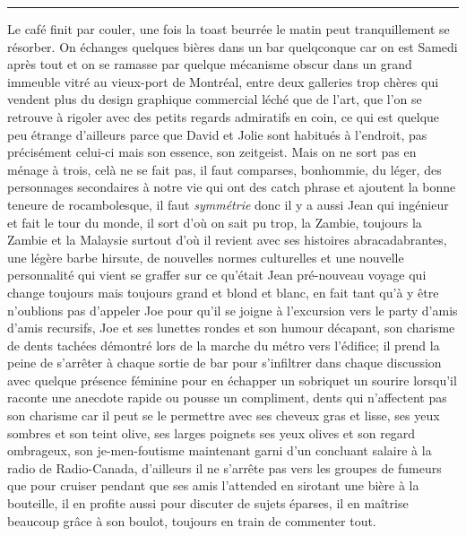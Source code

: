 \begin{center}\noindent\rule{0.5\textwidth}{0.4pt}\end{center} Le café finit par
couler, une fois la toast beurrée le matin peut tranquillement  se résorber. On
échanges quelques bières dans
un bar quelqconque car on est Samedi après tout et on se ramasse par quelque
mécanisme obscur dans un grand immeuble vitré au vieux-port de Montréal, entre
deux galleries trop chères qui vendent plus du design graphique commercial léché
que de l'art, que l'on se retrouve à rigoler avec des petits regards admiratifs
en coin, ce qui est quelque peu étrange d'ailleurs parce que David
et Jolie sont habitués à l'endroit, pas précisément celui-ci mais son essence,
son zeitgeist. Mais on ne sort pas en ménage à trois, celà ne se fait pas,
il faut comparses, bonhommie, du léger, des personnages secondaires
à notre vie qui ont des catch phrase et ajoutent la bonne teneure de 
rocambolesque, il faut \emph{symmétrie} donc il y a aussi Jean qui ingénieur et
fait le tour du monde, il sort d'où on sait pu trop, la Zambie, toujours la
Zambie et la Malaysie surtout d'où il revient avec ses histoires
abracadabrantes, une légère barbe hirsute, de nouvelles normes culturelles et
une nouvelle personnalité qui vient se graffer sur ce qu'était Jean pré-nouveau
voyage qui change toujours mais toujours grand et blond et blanc, en fait tant
qu'à y être n'oublions pas d'appeler Joe pour qu'il se joigne à l'excursion vers
le party d'amis d'amis recursifs, Joe et  ses lunettes rondes et son humour
décapant, son charisme de dents tachées démontré lors de la marche du métro
vers l'édifice; il prend la peine de s'arrêter à chaque sortie de bar
pour s'infiltrer dans chaque discussion avec quelque présence féminine pour
en échapper un sobriquet un sourire lorsqu'il raconte une anecdote rapide
ou pousse un compliment, dents qui n'affectent pas son charisme
car il peut se le permettre avec ses cheveux gras et lisse, ses yeux sombres et
son teint olive, ses larges poignets ses yeux olives et son regard ombrageux,
son je-men-foutisme maintenant garni d'un concluant salaire à la radio de
Radio-Canada, d'ailleurs il ne s'arrête pas vers les groupes de fumeurs
que pour cruiser pendant que ses amis l'attended en sirotant une bière à
la bouteille, il en profite aussi pour discuter de sujets éparses, il en maîtrise
beaucoup grâce à son boulot, toujours en train de commenter tout.\\


